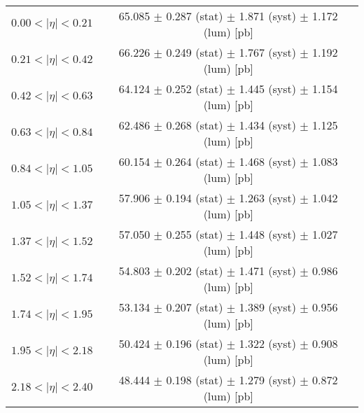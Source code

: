 \begin{tabular}{lc}
\hline
$0.00 < |\eta| <0.21$          & 65.085 $\pm$ 0.287 (stat) $\pm$ 1.871 (syst) $\pm$ 1.172 (lum) [pb]  \\
$0.21 < |\eta| <0.42$          & 66.226 $\pm$ 0.249 (stat) $\pm$ 1.767 (syst) $\pm$ 1.192 (lum) [pb]  \\
$0.42 < |\eta| <0.63$          & 64.124 $\pm$ 0.252 (stat) $\pm$ 1.445 (syst) $\pm$ 1.154 (lum) [pb]  \\
$0.63 < |\eta| <0.84$          & 62.486 $\pm$ 0.268 (stat) $\pm$ 1.434 (syst) $\pm$ 1.125 (lum) [pb]  \\
$0.84 < |\eta| <1.05$          & 60.154 $\pm$ 0.264 (stat) $\pm$ 1.468 (syst) $\pm$ 1.083 (lum) [pb]  \\
$1.05 < |\eta| <1.37$          & 57.906 $\pm$ 0.194 (stat) $\pm$ 1.263 (syst) $\pm$ 1.042 (lum) [pb]  \\
$1.37 < |\eta| <1.52$          & 57.050 $\pm$ 0.255 (stat) $\pm$ 1.448 (syst) $\pm$ 1.027 (lum) [pb]  \\
$1.52 < |\eta| <1.74$          & 54.803 $\pm$ 0.202 (stat) $\pm$ 1.471 (syst) $\pm$ 0.986 (lum) [pb]  \\
$1.74 < |\eta| <1.95$          & 53.134 $\pm$ 0.207 (stat) $\pm$ 1.389 (syst) $\pm$ 0.956 (lum) [pb]  \\
$1.95 < |\eta| <2.18$          & 50.424 $\pm$ 0.196 (stat) $\pm$ 1.322 (syst) $\pm$ 0.908 (lum) [pb]  \\
$2.18 < |\eta| <2.40$          & 48.444 $\pm$ 0.198 (stat) $\pm$ 1.279 (syst) $\pm$ 0.872 (lum) [pb]  \\
\hline
\end{tabular}
